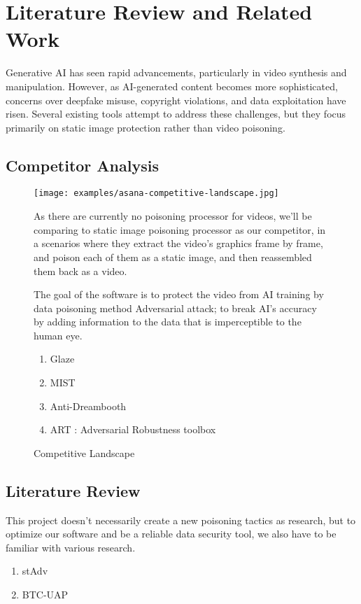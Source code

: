 \chapter{Literature Review and Related Work}
\label{chap:relatedworks}

Generative AI has seen rapid advancements, particularly in video synthesis and manipulation. 
However, as AI-generated content becomes more sophisticated, concerns over deepfake misuse, copyright violations, 
and data exploitation have risen. Several existing tools attempt to address these challenges, 
but they focus primarily on static image protection rather than video poisoning.

\section{Competitor Analysis}
\label{section:competitor-analysis}

\begin{figure}[h]
    \centering
    \texttt{[image: examples/asana-competitive-landscape.jpg]}
    \caption{Competitive Landscape}

    As there are currently no poisoning processor for videos, we'll be comparing to static image poisoning processor as our competitor, in a scenarios where they extract the video's graphics frame by frame, and poison each of them as a static image, and then reassembled them back as a video.

    The goal of the software is to protect the video from AI training by data poisoning method Adversarial attack; to break AI's accuracy by adding information to the data that is imperceptible to the human eye.
    \begin{enumerate}
        \item Glaze
        \item MIST
        \item Anti-Dreambooth
        \item ART : Adversarial Robustness toolbox
    \end{enumerate}

\end{figure}

\section{Literature Review}
\label{section:literature-review}
This project doesn't necessarily create a new poisoning tactics as research, but to optimize our software and be a reliable data security tool, we also have to be familiar with various research.
\begin{enumerate}
    \item stAdv
    \item BTC-UAP
\end{enumerate}